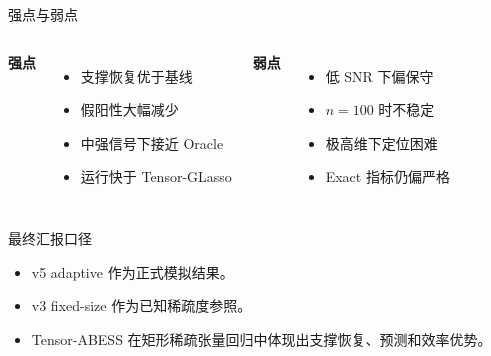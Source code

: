 \documentclass[11pt]{beamer}
\begin{document}
\begin{frame}{强点与弱点}
\small
\begin{columns}
\textbf{强点}
\begin{itemize}
  \item 支撑恢复优于基线
  \item 假阳性大幅减少
  \item 中强信号下接近 Oracle
  \item 运行快于 Tensor-GLasso
\end{itemize}
\textbf{弱点}
\begin{itemize}
  \item 低 SNR 下偏保守
  \item $n=100$ 时不稳定
  \item 极高维下定位困难
  \item Exact 指标仍偏严格
\end{itemize}
\end{columns}
\end{frame}
\begin{frame}{最终汇报口径}
\begin{itemize}
  \item v5 adaptive 作为正式模拟结果。
  \item v3 fixed-size 作为已知稀疏度参照。
  \item Tensor-ABESS 在矩形稀疏张量回归中体现出支撑恢复、预测和效率优势。
\end{itemize}
\end{frame}
\end{document}
